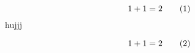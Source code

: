 \documentclass{article}
\newcommand\addtag{\refstepcounter{equation}\tag{\theequation}}
\begin{document}
\[
  1+1=2  \addtag
\]
hujjj


\[
  1+1=2  \addtag
\]
\end{document}
